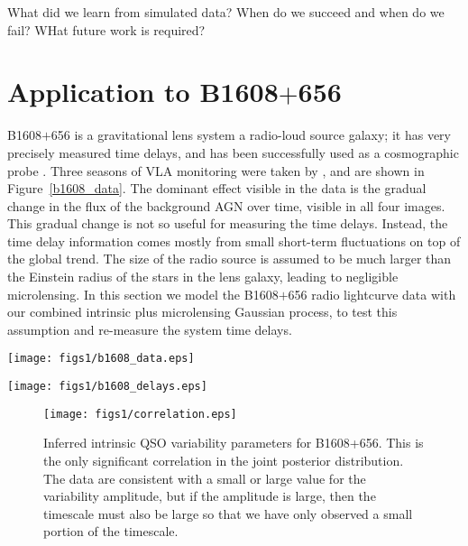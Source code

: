 \documentclass[useAMS,usenatbib, a4paper]{mn2e} \usepackage{natbib}
\begin{document}
What did we learn from simulated data?
When do we succeed and when do we fail?
WHat future work is required?


\section{Application to B1608$+$656}

B1608$+$656 is a gravitational lens system a radio-loud source galaxy; it has 
very precisely measured time delays, and has been successfully used as a
cosmographic probe \citep[e.g.][]{Suy++10}.  Three seasons of VLA monitoring
were taken by  \citet{2002ApJ...581..823F, 1999ApJ...527..498F},  and are
shown in Figure~\ref{b1608_data}. The dominant effect visible in the data is
the gradual change in the flux of the background AGN over time, visible in all
four images. This gradual change is not so useful for measuring the time
delays. Instead, the time delay information comes mostly from small short-term
fluctuations on top of the global trend. The size of the radio source is
assumed to be much larger than the Einstein radius of the stars in the lens
galaxy, leading to negligible microlensing. In this section we model the
B1608$+$656 radio lightcurve data with our combined intrinsic plus
microlensing Gaussian process, to test this assumption and re-measure the
system time delays.

\begin{figure*}
\texttt{[image: figs1/b1608\_data.eps]}
\caption{Monitoring data for B1608+656.\label{b1608_data}}
\end{figure*}

\begin{figure*}
\texttt{[image: figs1/b1608\_delays.eps]}
\caption{Inferred time delays for B1608+656.\label{b1608_delays}}
\end{figure*}

\begin{figure}
\texttt{[image: figs1/correlation.eps]}
\caption{Inferred intrinsic QSO variability parameters for B1608+656. This is the only significant correlation in the joint posterior distribution. The data are consistent with a small or large value for the variability amplitude, but if the amplitude is large, then the timescale must also be large so that we have only observed a small portion of the timescale.\label{correlation}}
\end{figure}
\end{document}
